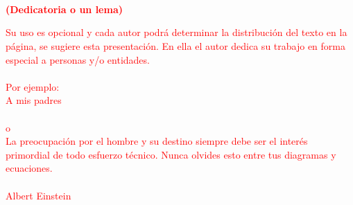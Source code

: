 
\newpage
\thispagestyle{empty} \textbf{}\normalsize
\\\\\\%
\textcolor{red}{
\textbf{(Dedicatoria o un lema)}\\[4.0cm]}

\begin{flushright}
\begin{minipage}{8cm}
    \noindent
        \small
\textcolor{red}{
Su uso es opcional y cada autor podr\'{a} determinar la distribuci\'{o}n del texto en la p\'{a}gina, se sugiere esta presentaci\'{o}n. En ella el autor dedica su trabajo en forma especial a personas y/o entidades.\\[1.0cm]\\
        Por ejemplo:\\[1.0cm]
        A mis padres\\[1.0cm]\\
        o\\[1.0cm]
        La preocupaci\'{o}n por el hombre y su destino siempre debe ser el
        inter\'{e}s primordial de todo esfuerzo t\'{e}cnico. Nunca olvides esto
        entre tus diagramas y ecuaciones.\\\\
        Albert Einstein\\
        }
\end{minipage}
\end{flushright}

\newpage{\pagestyle{empty}\cleardoublepage}
